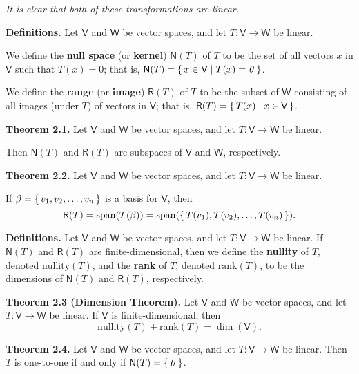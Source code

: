 \documentclass{article}
\newcommand{\0}{\mathit{0}}
\begin{document}
\textsl{It is clear that both of these transformations are linear.}

\medskip

\textbf{Definitions.} Let $\mathsf{V}$ and $\mathsf{W}$ be vector spaces, and let
$T: \mathsf{V} \to \mathsf{W}$ be linear.

We define the \textbf{null space} (or \textbf{kernel}) $\mathsf{N}(T)$ of $T$ to be the set of all vectors
$x$ in $\mathsf{V}$ such that $T(x) = \0$; that is,
$\mathsf{N}(T) = \set{x \in \mathsf{V} \mid T(x) = \0}$.

We define the \textbf{range} (or \textbf{image}) $\mathsf{R}(T)$ of $T$ to be the subset of $\mathsf{W}$
consisting of all images (under $T$) of vectors in $\mathsf{V}$; that is,
$\mathsf{R}(T) = \set{T(x) \mid x \in \mathsf{V}}$.

\medskip

\textbf{Theorem 2.1.} Let $\mathsf{V}$ and $\mathsf{W}$ be vector spaces, and let
$T: \mathsf{V} \to \mathsf{W}$ be linear.

Then $\mathsf{N}(T)$ and $\mathsf{R}(T)$ are subspaces of $\mathsf{V}$ and $\mathsf{W}$, respectively.

\medskip

\textbf{Theorem 2.2.} Let $\mathsf{V}$ and $\mathsf{W}$ be vector spaces, and let
$T: \mathsf{V} \to \mathsf{W}$ be linear.

If $\beta = \set{v_1, v_2, \dots, v_n}$ is a basis for $\mathsf{V}$, then
\[
    \mathsf{R}(T) = \mathrm{span}(T(\beta)) = \mathrm{span}(\set{T(v_1), T(v_2), \dots, T(v_n)}).
\]

\medskip

\textbf{Definitions.} Let $\mathsf{V}$ and $\mathsf{W}$ be vector spaces, and let
$T: \mathsf{V} \to \mathsf{W}$ be linear.
If $\mathsf{N}(T)$ and $\mathsf{R}(T)$ are finite-dimensional, then we define the
\textbf{nullity} of $T$, denoted $\mathrm{nullity}(T)$, and the \textbf{rank} of $T$,
denoted $\mathrm{rank}(T)$, to be the dimensions of $\mathsf{N}(T)$ and $\mathsf{R}(T)$, respectively.

\medskip

\textbf{Theorem 2.3 (Dimension Theorem).} Let $\mathsf{V}$ and $\mathsf{W}$ be vector spaces,
and let $T: \mathsf{V} \to \mathsf{W}$ be linear.
If $\mathsf{V}$ is finite-dimensional, then
\[
    \mathrm{nullity}(T) + \mathrm{rank}(T) = \dim(\mathsf{V}).
\]

\medskip

\textbf{Theorem 2.4.} Let $\mathsf{V}$ and $\mathsf{W}$ be vector spaces, and let
$T: \mathsf{V} \to \mathsf{W}$ be linear.
Then $T$ is one-to-one if and only if $\mathsf{N}(T) = \set{\0}$.
\end{document}
